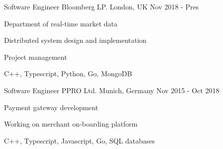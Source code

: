 

\begin{cventries}

  \cventry
    {Software Engineer} %
    {Bloomberg LP.} %
    {London, UK} %
    {Nov 2018 - Pres} %
    {
      \begin{cvitems} %
        \item {Department of real-time market data}
        \item {Distributed system design and implementation}
        \item {Project management}
        \item {C++, Typescript, Python, Go, MongoDB}
      \end{cvitems}
    }
  \cventry
    {Software Engineer} %
    {PPRO Ltd.} %
    {Munich, Germany} %
    {Nov 2015 - Oct 2018} %
    {
      \begin{cvitems} %
        \item {Payment gateway development}
        \item {Working on merchant on-boarding platform}
        \item {C++, Typescript, Javascript, Go, SQL databases}
      \end{cvitems}
    }

\end{cventries}
